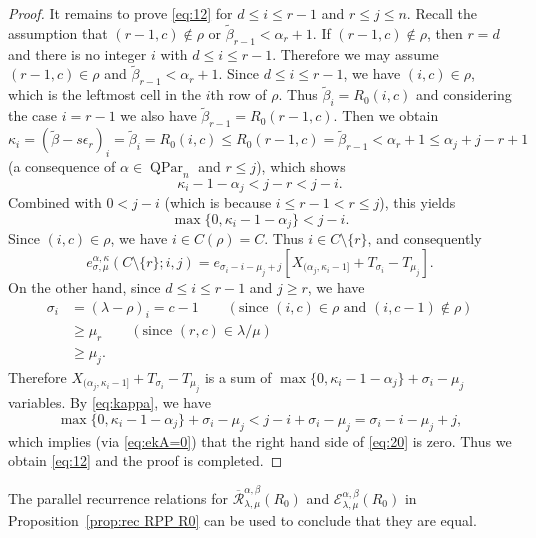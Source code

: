 \documentclass[12pt]{amsart}
\numberwithin{equation}{section}
\theoremstyle{definition}
\newcommand\wb{\widetilde{\beta}}
\newcommand\QPar{\operatorname{QPar}}
\newcommand\lm{{\lambda/\mu}}
\newcommand\R{\mathcal{R}}
\newcommand\oR{\overline{\R}}
\newcommand\EE{\mathcal{E}}
\begin{document}
\begin{proof}
  It remains to prove \eqref{eq:12} for $d\le i\le r-1$ and $r\le j\le n$.
  Recall the assumption that $(r-1,c)\notin\rho$ or $\wb_{r-1}<\alpha_r+1$. If
  $(r-1,c)\notin\rho$, then $r=d$ and there is no integer $i$ with $d\le i\le
  r-1$. Therefore we may assume $(r-1,c)\in\rho$ and $\wb_{r-1}<\alpha_r+1$.
  Since $d\le i\le r-1$, we have $(i,c)\in \rho$, which is the leftmost cell in
  the $i$th row of $\rho$. Thus $\wb_{i} = R_0(i,c)$ and considering the case
  $i=r-1$ we also have $\wb_{r-1} = R_0(r-1,c)$. Then we obtain
\[
\kappa_i = (\wb-s\epsilon_r)_i = \wb_i = R_0(i,c) \le R_0(r-1,c) = \wb_{r-1}<
\alpha_r+1 \le \alpha_j+j-r+1
\]
(a consequence of $\alpha \in \QPar_n$ and $r \le j$),
which shows
\[
\kappa_i-1-\alpha_j < j-r <j-i.
\]
Combined with $0<j-i$ (which is because $i\le r-1<r\le j$), this yields
\begin{equation}\label{eq:kappa}
\max\{0,\kappa_i-1-\alpha_j\} <j-i.
\end{equation}
Since $(i, c) \in \rho$, we have $i\in C(\rho)=C$. Thus $i\in
C\setminus\{r\}$, and consequently
  \begin{equation}\label{eq:20}
    e^{\alpha,\kappa}_{\sigma,\mu}(C\setminus\{r\};i,j) =
    e_{\sigma_i-i-\mu_j+j}[X_{(\alpha_j,\kappa_i-1]} + T_{\sigma_i}-T_{\mu_j}].
  \end{equation}
  On the other hand, since $d\le i\le r-1$ and $j\ge r$, we have
\begin{align*}
\sigma_i &= (\lambda-\rho)_i = c-1 
\qquad \left(\text{since $(i, c) \in \rho$ and $(i, c-1) \notin \rho$}\right) \\
&\ge \mu_r
\qquad \left(\text{since $(r, c) \in \lm$}\right) \\
&\ge \mu_j.
\end{align*}
Therefore
$X_{(\alpha_j,\kappa_i-1]} + T_{\sigma_i}-T_{\mu_j}$
is a sum of $\max\{0,\kappa_i-1-\alpha_j\}+\sigma_i-\mu_j$ variables.
By \eqref{eq:kappa}, we have
\[
  \max\{0,\kappa_i-1-\alpha_j\}+\sigma_i-\mu_j < j-i +\sigma_i-\mu_j
  = \sigma_i-i-\mu_j+j,
\]
which implies (via \eqref{eq:ekA=0})
that the right hand side of \eqref{eq:20} is zero.
Thus we obtain \eqref{eq:12} and the proof is completed.
\end{proof}



The parallel recurrence relations for $\oR^{\alpha,\beta}_{\lambda,\mu}(R_0)$ and
$\EE^{\alpha,\beta}_{\lambda,\mu}(R_0)$ in Proposition~\ref{prop:rec RPP R0} can
be used to conclude that they are equal.
\end{document}
